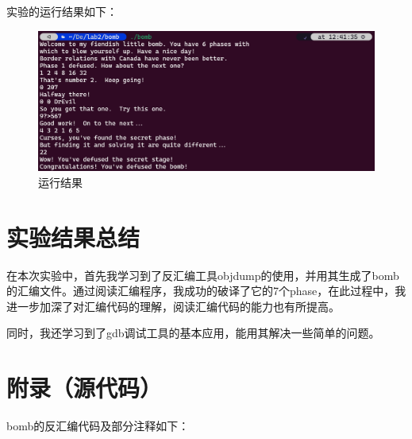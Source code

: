 \documentclass{article}
\begin{document}
实验的运行结果如下：
\begin{figure}[h]
  \centering
  \includegraphics[width=15cm]{lab2.png}
  \caption{运行结果}
\end{figure}

\normalsize
\section{实验结果总结}
\large
在本次实验中，首先我学习到了反汇编工具objdump的使用，并用其生成了bomb的汇编文件。通过阅读汇编程序，我成功的破译了它的7个phase，在此过程中，我进一步加深了对汇编代码的理解，阅读汇编代码的能力也有所提高。

同时，我还学习到了gdb调试工具的基本应用，能用其解决一些简单的问题。
\normalsize
\section{附录（源代码）}
\large
bomb的反汇编代码及部分注释如下：
\end{document}
